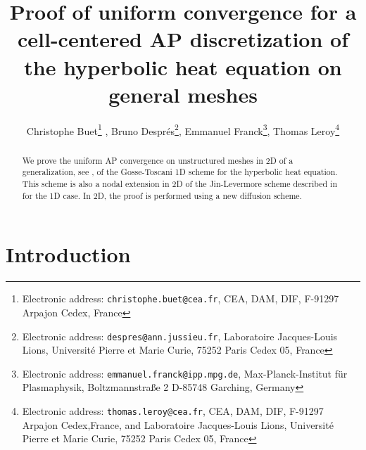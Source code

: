 \documentclass[a4paper,french,english,10pt]{article}
\begin{document}
\title{Proof of uniform convergence for a cell-centered  AP discretization  of the hyperbolic heat equation 
 on general meshes}


\author{Christophe Buet\thanks{Electronic address: 
\texttt{christophe.buet@cea.fr},
CEA, DAM, DIF,  F-91297 Arpajon Cedex, France}
,
Bruno Despr\'es\thanks{Electronic address: 
\texttt{despres@ann.jussieu.fr}, Laboratoire Jacques-Louis Lions,
  Universit\'e Pierre et Marie Curie,
  75252 Paris Cedex 05,
  France},
Emmanuel Franck\thanks{Electronic address: \texttt{emmanuel.franck@ipp.mpg.de}, Max-Planck-Institut f\"ur Plasmaphysik, Boltzmannstra\ss e 2
D-85748 Garching, Germany},
Thomas Leroy\thanks{Electronic address: \texttt{thomas.leroy@cea.fr},
CEA, DAM, DIF, F-91297 Arpajon Cedex,France,
and Laboratoire Jacques-Louis Lions,
  Universit\'e Pierre et Marie Curie,
  75252 Paris Cedex 05,
  France}
}





\maketitle

\begin{abstract} 
We prove the uniform  AP convergence on unstructured
meshes in 2D of a  generalization, see \cite{glaceap},      of the Gosse-Toscani 
 1D scheme  for the hyperbolic heat equation. 
This   scheme 
 is also a nodal  extension in 2D  of the Jin-Levermore scheme described in \cite{jinlev} for the  1D case.
In 2D, the proof  is performed using a new diffusion scheme.
\end{abstract}


\section{Introduction}
\end{document}
